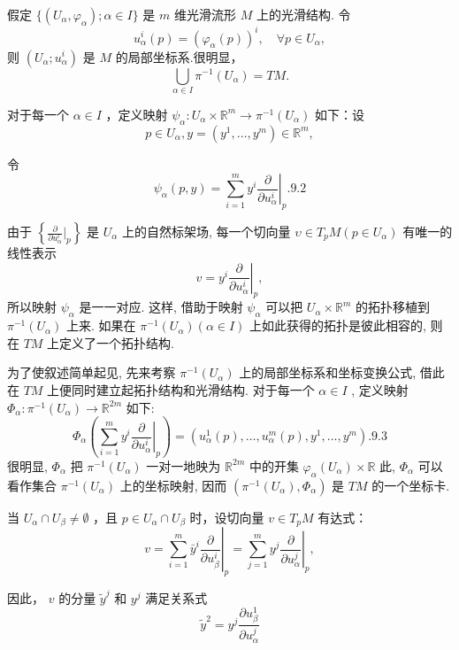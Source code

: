假定  $\{(U_{\alpha},\varphi_{\alpha});\alpha \in I\}$  是  $m$  维光滑流形  $M$  上的光滑结构. 令
$$
u _ {\alpha} ^ {i} (p) = \left(\varphi_ {\alpha} (p)\right) ^ {i}, \quad \forall p \in U _ {\alpha},
$$
则  $(U_{\alpha};u_{\alpha}^{i})$  是  $M$  的局部坐标系.很明显，
$$
\bigcup_ {\alpha \in I} \pi^ {- 1} (U _ {\alpha}) = T M.
$$

对于每一个  $\alpha \in I$  ，定义映射  $\psi_{\alpha}:U_{\alpha}\times \mathbb{R}^{m}\to \pi^{-1}(U_{\alpha})$  如下：设
$$
p \in U _ {\alpha}, y = (y ^ {1}, \dots , y ^ {m}) \in \mathbb {R} ^ {m},
$$

令
$$
\psi_ {\alpha} (p, y) = \sum_ {i = 1} ^ {m} y ^ {i} \left. \frac {\partial}{\partial u _ {\alpha} ^ {i}} \right| _ {p}.  {9.2}
$$

由于  $\left\{\frac{\partial}{\partial u_{\alpha}^{\iota}}\bigg|_{p}\right\}$  是  $U_{\alpha}$  上的自然标架场, 每一个切向量  $\upsilon \in T_pM(p \in U_\alpha)$  有唯一的线性表示
$$
v = y ^ {i} \left. \frac {\partial}{\partial u _ {\alpha} ^ {i}} \right| _ {p},
$$
所以映射  $\psi_{\alpha}$  是一一对应. 这样, 借助于映射  $\psi_{\alpha}$  可以把  $U_{\alpha} \times \mathbb{R}^{m}$  的拓扑移植到  $\pi^{-1}(U_{\alpha})$  上来. 如果在  $\pi^{-1}(U_{\alpha})(\alpha \in I)$  上如此获得的拓扑是彼此相容的, 则在  $TM$  上定义了一个拓扑结构.

为了使叙述简单起见, 先来考察  $\pi^{-1}(U_{\alpha})$  上的局部坐标系和坐标变换公式, 借此在  $TM$  上便同时建立起拓扑结构和光滑结构. 对于每一个  $\alpha \in I$ , 定义映射  $\Phi_{\alpha}: \pi^{-1}(U_{\alpha}) \to \mathbb{R}^{2m}$  如下:
$$
\Phi_ {\alpha} \left(\sum_ {i = 1} ^ {m} y ^ {i} \left. \frac {\partial}{\partial u _ {\alpha} ^ {i}} \right| _ {p}\right) = \left(u _ {\alpha} ^ {1} (p), \dots , u _ {\alpha} ^ {m} (p), y ^ {1}, \dots , y ^ {m}\right).  {9.3}
$$
很明显,  $\Phi_{\alpha}$  把  $\pi^{-1}(U_{\alpha})$  一对一地映为  $\mathbb{R}^{2m}$  中的开集  $\varphi_{\alpha}(U_{\alpha}) \times \mathbb{R}$  此,  $\Phi_{\alpha}$  可以看作集合  $\pi^{-1}(U_{\alpha})$  上的坐标映射, 因而  $(\pi^{-1}(U_{\alpha}), \Phi_{\alpha})$  是  $TM$  的一个坐标卡.

当  $U_{\alpha} \cap U_{\beta} \neq \emptyset$ ，且  $p \in U_{\alpha} \cap U_{\beta}$  时，设切向量  $v \in T_pM$  有达式：
$$
v = \sum_ {i = 1} ^ {m} \bar {y} ^ {i} \left. \frac {\partial}{\partial u _ {\beta} ^ {i}} \right| _ {p} = \sum_ {j = 1} ^ {m} y ^ {j} \left. \frac {\partial}{\partial u _ {\alpha} ^ {j}} \right| _ {p},
$$

因此，  $v$  的分量  $\tilde{y}^j$  和  $y^{j}$  满足关系式
$$
\tilde {y} ^ {2} = y ^ {j} \frac {\partial u _ {\beta} ^ {1}}{\partial u _ {\alpha} ^ {j}}
$$

